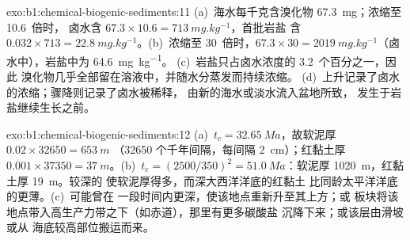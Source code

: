 \begin{solution}{exo:b1:chemical-biogenic-sediments:11}
(a)~海水每千克含溴化物 \qty{67.3}{mg}；浓缩至 10.6~倍时，
卤水含 $67.3\times10.6 = \qty{713}{mg.kg^{-1}}$，首批岩盐
含 $0.032\times713 = \qty{22.8}{mg.kg^{-1}}$。(b)~浓缩至 30~倍时，$67.3\times30 =
\qty{2019}{mg.kg^{-1}}$（卤水中），岩盐中为 \qty{64.6}{mg.kg^{-1}}。
(c)~岩盐只占卤水浓度的 3.2~个百分之一，因此
溴化物几乎全部留在溶液中，并随水分蒸发而持续浓缩。
(d)~上升记录了卤水的浓缩；骤降则记录了卤水被稀释，
由新的海水或淡水流入盆地所致，
发生于岩盐继续生长之前。
\end{solution}

\begin{solution}{exo:b1:chemical-biogenic-sediments:12}
(a)~$t_c = \qty{32.65}{Ma}$，故软泥厚 $0.02\times\num{32650} = \qty{653}{m}$
（\num{32650} 个千年间隔，每间隔 \qty{2}{cm}）；红黏土厚
$0.001\times\num{37350} = \qty{37}{m}$。(b)~$t_c = (2500/350)^2 =
\qty{51.0}{Ma}$：软泥厚 \qty{1020}{m}，红黏土厚 \qty{19}{m}。较深的
使软泥厚得多，而深大西洋洋底的红黏土
比同龄太平洋洋底的更薄。(c)~可能曾在
一段时间内更深，使该地点重新升至其上方；或
板块将该地点带入高生产力带之下（如赤道），那里有更多碳酸盐
沉降下来；或该层由滑坡或从
海底较高部位搬运而来。
\end{solution}


